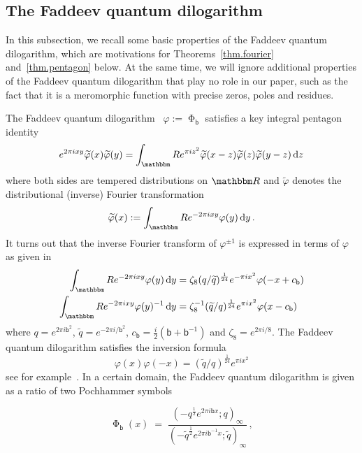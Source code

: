 \documentclass[12pt,reqno]{amsart}
\theoremstyle{definition}
\def\BR{\mathbbm R}
\def\be{\begin{equation}}
\def\ee{\end{equation}}
\newcommand{\fad}{\operatorname{\Phi}_{\mathsf{b}}}
\def\bb{\mathsf{b}}
\def\e{\bold e}
\def\vphi{\varphi}
\renewcommand{\=}{\;=\;}
\newcommand{\tq}{\widetilde q}
\begin{document}
\subsection{The Faddeev quantum dilogarithm}
\label{sub.faddeev}

In this subsection, we recall some basic properties of the Faddeev quantum
dilogarithm, which are motivations for Theorems~\ref{thm.fourier}
and~\ref{thm.pentagon} below. At the same time, we will ignore additional
properties of the Faddeev quantum dilogarithm that play no role in our paper,
such as the fact that it is a meromorphic function with precise
zeros, poles and residues.
  

The Faddeev quantum dilogarithm~\cite{Faddeev} $\vphi:=\fad{}$ satisfies a key
integral pentagon identity~\cite{FK:QDL} 
\be
\label{phipentagon}
  e^{2 \pi i x y} \widetilde\vphi(x)\widetilde\vphi(y) 
  =\int_\BR e^{\pi i z^2} \widetilde\vphi(x-z)\widetilde\vphi(z)\widetilde\vphi(y-z)
  \operatorname{d}\!z 
\ee
where both sides are tempered distributions on $\BR$ and $\widetilde\vphi$
denotes the distributional (inverse) Fourier transformation
\begin{equation}\label{phifourier}
\widetilde\vphi(x):=\int_\BR e^{-2 \pi i x y} \vphi(y) \operatorname{d}\!y \,.
\end{equation}
It turns out that the inverse Fourier transform of $\vphi^{\pm 1}$ is expressed
in terms of $\vphi$ as given in~\cite[Sec.13.2]{AK}
\be
\label{fff}
\begin{aligned}
\int_\BR e^{-2 \pi i x y} \vphi(y) \operatorname{d}\!y &=
\zeta_8 (q/\tq)^{\frac{1}{24}} e^{-\pi i x^2} \vphi(-x+c_\bb) \\
\int_\BR e^{-2 \pi i x y} \vphi(y)^{-1} \operatorname{d}\!y &=
\zeta_8^{-1} (\tq/q)^{\frac{1}{24}} e^{\pi i x^2} \vphi(x-c_\bb) 
\end{aligned}
\ee
where $q=e^{2 \pi i \bb^2}$, $\tq=e^{-2\pi i/\bb^2}$, $c_\bb=\frac{i}{2}(\bb+\bb^{-1})$
and $\zeta_8=e^{2 \pi i/8}$. 
The Faddeev quantum dilogarithm satisfies the inversion formula 
\be
\label{doublephi}
\vphi(x) \vphi(-x) = (\tq/q)^{\frac{1}{24}} e^{\pi i x^2}
\ee
see for example~\cite[App.A]{AK}.
In a certain domain, the Faddeev quantum dilogarithm is given as a ratio
of two Pochhammer symbols 

\be
\fad(x) \= \frac{(-q^{\frac{1}{2}} e^{2 \pi i \bb x};q)_\infty}{
  (-\tq^{\frac{1}{2}} e^{2 \pi i \bb^{-1} x};\tq)_\infty} \,,
\ee
\end{document}
